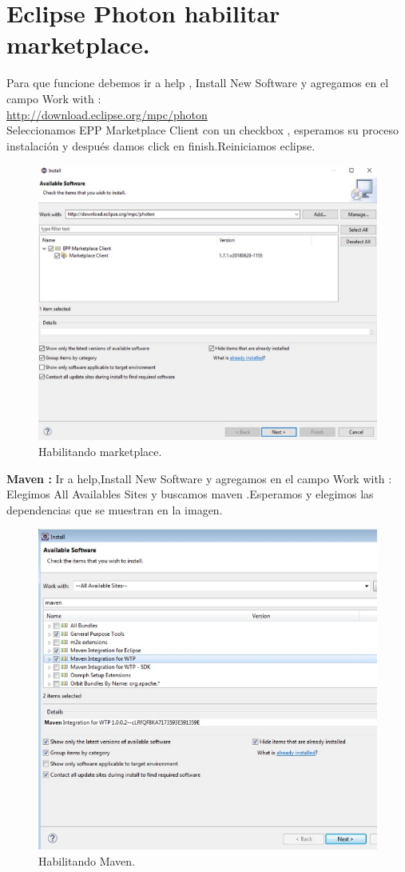 \section{Eclipse Photon habilitar marketplace.}
Para que funcione debemos ir a help , Install New Software y agregamos en  el campo Work with :\\
\url{http://download.eclipse.org/mpc/photon}\\
Seleccionamos EPP Marketplace Client  con un checkbox , esperamos su proceso instalaci\'on y despu\'es damos click en finish.Reiniciamos eclipse.
\begin{figure}[H] 
	\centering
	\includegraphics[scale=0.9]{images/c13_3.jpg}
	\caption{Habilitando marketplace.}
\end{figure}
\textbf{Maven :} Ir a help,Install New Software y agregamos en  el campo Work with  : Elegimos All Availables Sites y buscamos maven .Esperamos y elegimos  las dependencias que se muestran en la imagen.
\begin{figure}[H] 
	\centering
	\includegraphics[scale=0.9]{images/c13_4.jpg}
	\caption{Habilitando Maven.}
\end{figure}
